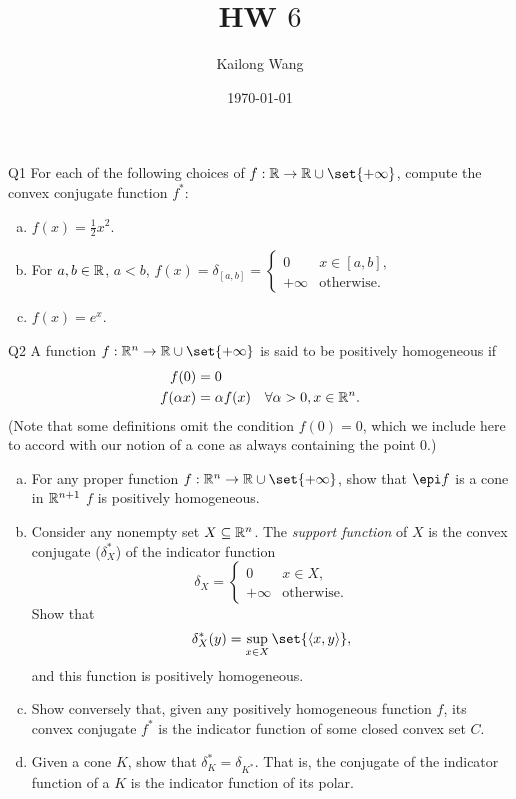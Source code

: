 \documentclass{article}
\title{HW $6$}
\author{Kailong Wang}
\date{\today}
\begin{document}
\maketitle

\begin{problem}
    {Q1}
    For each of the following choices of $f:\R\rightarrow \R \cup \set{+\infty}$, compute the convex conjugate function $f^*$:
    \begin{enumerate}[(a)]
        \item $f(x)=\frac{1}{2}x^2$.
        \item For $a ,b\in\mathbb{R}$, $a<b$, ${
            f(x)=\delta_{[a, b]}= \begin{cases}
                0 & x\in [a, b],\\
                +\infty & \text{otherwise}.
            \end{cases}
            }$
        \item $f(x)=e^x$.
    \end{enumerate}
\end{problem}

\begin{problem}
    {Q2}
    A function $f:\R^n\rightarrow\R\cup\set{+\infty}$ is said to be positively homogeneous if
    \begin{align*}
        f(0) &= 0 \\
        f(\alpha x) &= \alpha f(x) \quad \forall \alpha > 0, x\in\mathbb{R}^n.
    \end{align*}
    (Note that some definitions omit the condition $f(0) = 0$, which we include here to accord with our notion of a cone as always containing the point $0$.)
    \begin{enumerate}[(a)]
        \item For any proper function $f:\R^n\rightarrow\R\cup\set{+\infty}$, show that $\epi f$ is a cone in $\mathbb{R}^{n+1}$ \iff $f$ is positively homogeneous.
        \item Consider any nonempty set $X\subseteq\mathbb{R}^n$. The \textit{support function} of $X$ is the convex conjugate ($\delta_X^*$) of the indicator function \[\delta_X = \begin{cases}
            0 & x\in X,\\
            +\infty & \text{otherwise}.
        \end{cases}\]
        Show that \[\delta_X^*(y)=\sup_{x\in X}\set{\angles*{x, y}},\] and this function is positively homogeneous.
        \item Show conversely that, given any positively homogeneous function $f$, its convex conjugate $f^*$ is the indicator function of some closed convex set $C$.
        \item Given a cone $K$, show that $\delta_K^* = \delta_{K^*}$. That is, the conjugate of the indicator function of a $K$ is the indicator function of its polar.
    \end{enumerate}
\end{problem}
\end{document}
